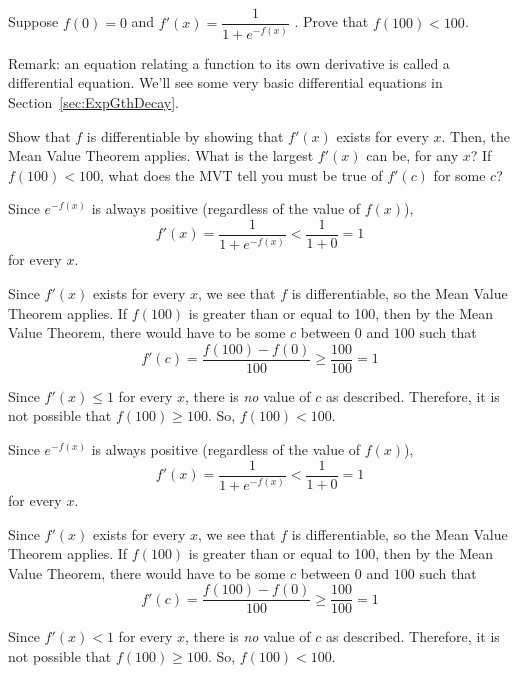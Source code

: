 \subsection*{\Application}


\begin{question}[2009H]
 Suppose $f(0) = 0$ and
$f'(x) = \dfrac{1}{1 + e^{-f(x)}}$ . Prove that $f(100) < 100$.
\medskip

Remark: an equation  relating a function to its own derivative is called a differential equation. We'll see some very basic differential equations in Section~\ref*{sec:ExpGthDecay}.
\end{question}
\begin{hint}
Show that $f$ is differentiable by showing that $f'(x)$ exists for every $x$. Then, the Mean Value Theorem applies. What is the largest $f'(x)$ can be, for any $x$? If $f(100)<100$, what does the MVT tell you must be true of $f'(c)$ for some $c$?
\end{hint}
\begin{answer}
Since $e^{-f(x)}$ is always positive (regardless of the value of $f(x)$),
\[f'(x)=\dfrac{1}{1+e^{-f(x)}}<\dfrac{1}{1+0}=1\] for every $x$.

Since  $f'(x)$ exists for every $x$, we see that $f$ is differentiable, so the Mean Value Theorem applies. If $f(100)$ is greater than or equal to 100, then by the Mean Value Theorem,
 there would have
to be some $c$ between $0$ and $100$ such that
$$
f'(c) = \frac{f(100)-f(0)}{100}\geq\frac{100}{100}= 1
$$

Since $f'(x) \leq 1$ for every $x$, there is \emph{no} value of $c$ as described.
Therefore, it is not possible that  $f(100) \geq 100$. So, $f(100)<100$.
\end{answer}
\begin{solution}
Since $e^{-f(x)}$ is always positive (regardless of the value of $f(x)$),
\[f'(x)=\dfrac{1}{1+e^{-f(x)}}<\dfrac{1}{1+0}=1\] for every $x$.

Since  $f'(x)$ exists for every $x$, we see that $f$ is differentiable, so the Mean Value Theorem applies. If $f(100)$ is greater than or equal to 100, then by the Mean Value Theorem,
 there would have
to be some $c$ between $0$ and $100$ such that
$$
f'(c) = \frac{f(100)-f(0)}{100}\geq\frac{100}{100}= 1
$$

Since $f'(x) < 1$ for every $x$, there is \emph{no} value of $c$ as described.
Therefore, it is not possible that  $f(100) \geq 100$. So, $f(100)<100$.
\end{solution}


